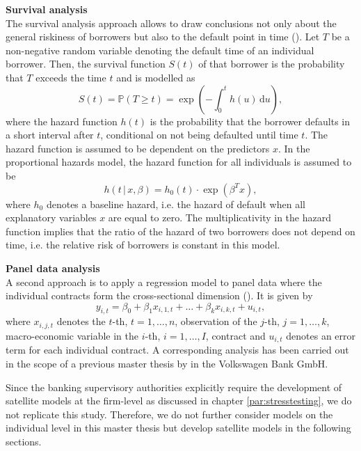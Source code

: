 \documentclass[a4paper, 11pt]{scrreprt}
\newcommand{\PP}{\mathbb{P}}
\begin{document}
\textbf{Survival analysis} \\
The survival analysis approach allows to draw conclusions not only about the general riskiness of borrowers but also to the default point in time (\textcite[chapter 1.7]{engelmann2011baselii}). Let $T$ be a non-negative random variable denoting the default time of an individual borrower. Then, the survival function $S(t)$ of that borrower is the probability that $T$ exceeds the time $t$ and is modelled as
\begin{equation}
S(t) = \PP(T \geq t) = \exp \left(-\int_0^t h(u) \, \mathrm{d}u \right),
\end{equation}
where the hazard function $h(t)$ is the probability that the borrower defaults in a short interval after $t$, conditional on not being defaulted until time $t$. 
The hazard function is assumed to be dependent on the predictors $x$. In the \textcite{cox1984survival} proportional hazards model, the hazard function for all individuals is assumed to be
\begin{equation}
h(t \, | \, x, \beta) = h_0(t) \cdot \exp (\beta^T x ),
\end{equation}
where $h_0$ denotes a baseline hazard, i.e. the hazard of default when all explanatory variables $x$ are equal to zero. 
The multiplicativity in the hazard function implies that the ratio of the hazard of two borrowers does not depend on time, i.e. the relative risk of borrowers is constant in this model. 

\bigskip

\textbf{Panel data analysis} \\
A second approach is to apply a regression model to panel data where the individual contracts form the cross-sectional dimension (\textcite[chapter 2]{baltagi2008panel}). 
It is given by 
\begin{equation}
y_{i,t} = \beta_0 + \beta_1 x_{i,1,t} + \ldots + \beta_k x_{i,k,t} + u_{i,t},
\end{equation}
where $x_{i,j,t}$ denotes the $t$-th, $t=1,\ldots,n$, observation of the $j$-th, $j=1,\ldots,k$, macro-economic variable in the $i$-th, $i=1,\ldots,I$, contract and $u_{i,t}$ denotes an error term for each individual contract.
A corresponding analysis has been carried out in the scope of a previous master thesis by \textcite{ivanchenko2017predicting} in the Volkswagen Bank GmbH. 

\bigskip

Since the banking supervisory authorities explicitly require the development of satellite models at the firm-level as discussed in chapter \ref{par:stresstesting}, we do not replicate this study. 
Therefore, we do not further consider models on the individual level in this master thesis but develop satellite models in the following sections.
\end{document}
